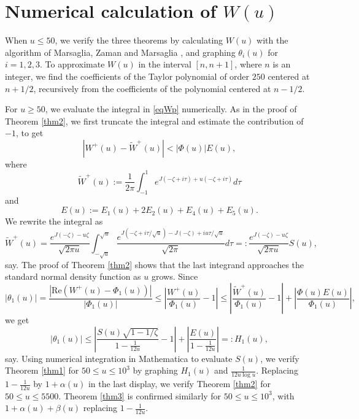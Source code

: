 \documentclass[11pt]{amsart}
\begin{document}
\section{Numerical calculation of $W(u)$}\label{SecNum}

When $ u \le 50$, we verify the three theorems by calculating $W(u)$ with the algorithm of Marsaglia, Zaman and Marsaglia \cite{MZM},
and graphing $\theta_i(u)$ for $i=1,2,3$.   
To approximate $W(u)$ in the interval $[n,n+1]$, where $n$ is an integer, 
we find the coefficients of the Taylor polynomial of order $250$ centered
at $n+1/2$, recursively from the coefficients of the polynomial centered at $n-1/2$.

For $u\ge 50$, we evaluate the integral in \eqref{eqWp} numerically. 
As in the proof of Theorem \ref{thm2}, we first truncate the integral and estimate the contribution of $-1$, to get
$$
|W^+(u)-\tilde{W}^+(u)|< |\Phi(u)| E(u),
$$
where
$$
\tilde{W}^+(u):=\frac{1}{2\pi } \int_{-1}^{1}  e^{J(-\zeta+i\tau)+u(-\zeta+i\tau)} d\tau
$$
and
$$
E(u):=E_1(u)+2E_2(u)+E_4(u)+E_5(u).
$$
We rewrite the integral as
$$
\tilde{W}^+(u)=\frac{e^{J(-\zeta)-u\zeta}}{\sqrt{2\pi u}}
 \int_{-\sqrt{u}}^{\sqrt{u}} \frac{e^{J(-\zeta+i\tau/\sqrt{u})-J(-\zeta)+iu\tau/\sqrt{u}}}{\sqrt{2\pi}} d\tau
=:\frac{e^{J(-\zeta)-u\zeta}}{\sqrt{2\pi u}} S(u),
$$
say.
The proof of Theorem \ref{thm2} shows that the last integrand approaches the standard normal density function as $u$ grows.
Since 
$$
|\theta_1(u)|=\frac{|\mathrm{Re}(W^+(u)-\Phi_1(u))|}{|\Phi_1(u)|}
\le \left| \frac{W^+(u)}{\Phi_1(u)} -1 \right|
\le \left| \frac{\tilde{W}^+(u)}{\Phi_1(u)} -1 \right| +\left| \frac{\Phi(u) E(u)}{\Phi_1(u)}\right|,
$$
we get
$$
|\theta_1(u)|\le \left|\frac{S(u) \sqrt{1-1/\zeta}}{1-\frac{1}{12u}} -1\right|
+\left|\frac{E(u)}{1-\frac{1}{12u}}\right|=:H_1(u),
$$
say.
Using numerical integration in Mathematica to evaluate $S(u)$, we 
verify Theorem \ref{thm1} for $50\le u \le 10^3$ by graphing $H_1(u)$ and $\frac{1}{12u\log u}$. 
Replacing $1-\frac{1}{12u}$ by $1+\alpha(u)$ in the last display,
we verify Theorem \ref{thm2} for $50\le u \le 5500$. 
Theorem \ref{thm3} is confirmed similarly for $50\le u \le 10^3$, with $1+\alpha(u)+\beta(u)$ replacing $1-\frac{1}{12u}$. 
\end{document}
